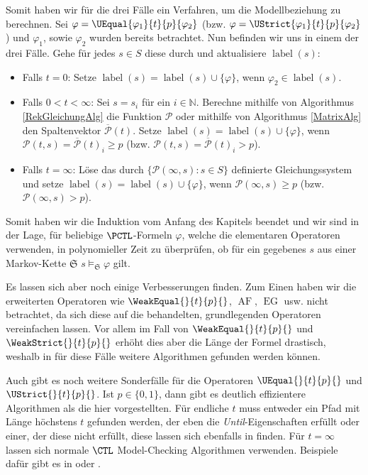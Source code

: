 Somit haben wir für die drei Fälle ein Verfahren, um die Modellbeziehung zu berechnen. Sei $\varphi = \UEqual{\varphi_1}{t}{p}{\varphi_2}$ (bzw. $\varphi = \UStrict{\varphi_1}{t}{p}{\varphi_2}$) und $\varphi_1$, sowie $\varphi_2$ wurden bereits betrachtet.
Nun befinden wir uns in einem der drei Fälle. Gehe für jedes $s\in S$ diese durch und aktualisiere $\operatorname{label}(s)$:
\begin{itemize}
	\item Falls $t=0$: Setze $\operatorname{label}(s) = \operatorname{label}(s)\cup \{\varphi\}$, wenn $\varphi_2\in \operatorname{label}(s)$.
	
	\item Falls $0<t<\infty$: Sei $s=s_i$ für ein $i\in \mathbb{N}$. Berechne mithilfe von Algorithmus \ref{RekGleichungAlg} die Funktion $\mathcal{P}$ oder mithilfe von Algorithmus \ref{MatrixAlg} den Spaltenvektor $\overline{\mathcal{P}}(t)$. 
	Setze $\operatorname{label}(s) = \operatorname{label}(s)\cup \{\varphi\}$, wenn $\mathcal{P}(t,s)=\overline{\mathcal{P}}(t)_i \geq p$ (bzw. $\mathcal{P}(t,s)=\overline{\mathcal{P}}(t)_i > p$).
	
	\item Falls $t=\infty$: Löse das durch $\{\mathcal{P}(\infty,s) : s\in S\}$ definierte Gleichungssystem und setze $\operatorname{label}(s) = \operatorname{label}(s)\cup \{\varphi\}$, wenn $\mathcal{P}(\infty,s) \geq p$ (bzw. $\mathcal{P}(\infty,s) > p$).
\end{itemize}
Somit haben wir die Induktion vom Anfang des Kapitels beendet und wir sind in der Lage, für beliebige $\PCTL$-Formeln $\varphi$, welche die elementaren Operatoren verwenden, in polynomieller Zeit zu überprüfen, ob für ein gegebenes $s$ aus einer Markov-Kette $\mathfrak{S}$ $s\models_\mathfrak{S} \varphi$ gilt.

Es lassen sich aber noch einige Verbesserungen finden. 
Zum Einen haben wir die erweiterten Operatoren wie $\WeakEqual{}{t}{p}{}$, $\operatorname{AF}$, $\operatorname{EG}$ usw. nicht betrachtet, da sich diese auf die behandelten, grundlegenden Operatoren vereinfachen lassen. 
Vor allem im Fall von $\WeakEqual{}{t}{p}{}$ und $\WeakStrict{}{t}{p}{}$ erhöht dies aber die Länge der Formel drastisch, weshalb in \cite{hansson1994logic} für diese Fälle weitere Algorithmen gefunden werden können.

Auch gibt es noch weitere Sonderfälle für die Operatoren $\UEqual{}{t}{p}{}$ und $\UStrict{}{t}{p}{}$. Ist $p\in \{0,1\}$, dann gibt es deutlich effizientere Algorithmen als die hier vorgestellten. Für endliche $t$ muss entweder ein Pfad mit Länge höchstens $t$ gefunden werden, der eben die \textit{Until}-Eigenschaften erfüllt oder einer, der diese nicht erfüllt, diese lassen sich ebenfalls in \cite{hansson1994logic} finden. Für $t=\infty$ lassen sich normale $\CTL$ Model-Checking Algorithmen verwenden. Beispiele dafür gibt es in \cite{baier2008principles} oder \cite{clarke1982design}.

